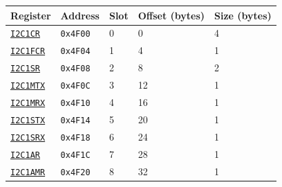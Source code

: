 \begin{tabularx}{\textwidth}{ l l l l X }
\textbf{Register} & \textbf{Address} & \textbf{Slot} & \textbf{Offset (bytes)} & \textbf{Size (bytes)} \\ \hline
\hyperref[ss:I2CxCR]{\texttt{I2C1CR}} & \texttt{0x4F00} & 0 & 0 & 4 \\
\rowcolor{tablehighlightcolor} \hyperref[ss:I2CxFCR]{\texttt{I2C1FCR}} & \texttt{0x4F04} & 1 & 4 & 1 \\
\hyperref[ss:I2CxSR]{\texttt{I2C1SR}} & \texttt{0x4F08} & 2 & 8 & 2 \\
\rowcolor{tablehighlightcolor} \hyperref[ss:I2CxMTX]{\texttt{I2C1MTX}} & \texttt{0x4F0C} & 3 & 12 & 1 \\
\hyperref[ss:I2CxMRX]{\texttt{I2C1MRX}} & \texttt{0x4F10} & 4 & 16 & 1 \\
\rowcolor{tablehighlightcolor} \hyperref[ss:I2CxSTX]{\texttt{I2C1STX}} & \texttt{0x4F14} & 5 & 20 & 1 \\
\hyperref[ss:I2CxSRX]{\texttt{I2C1SRX}} & \texttt{0x4F18} & 6 & 24 & 1 \\
\rowcolor{tablehighlightcolor} \hyperref[ss:I2CxAR]{\texttt{I2C1AR}} & \texttt{0x4F1C} & 7 & 28 & 1 \\
\hyperref[ss:I2CxAMR]{\texttt{I2C1AMR}} & \texttt{0x4F20} & 8 & 32 & 1 \\
\hline
\end{tabularx}

